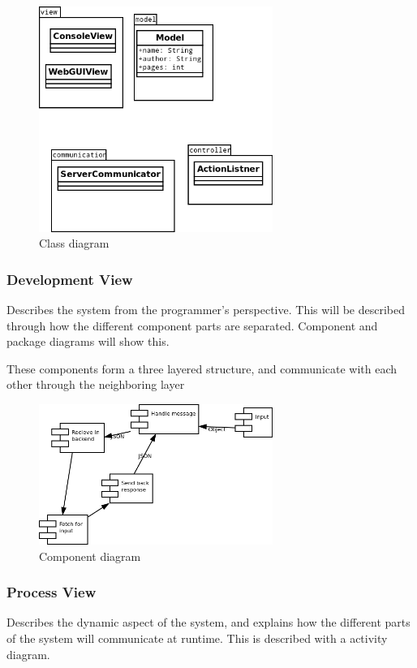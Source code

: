 \begin{figure}
\centering
\includegraphics[width=3in]{image/classdiagram.png}
\caption{Class diagram}
\end{figure}

\subsubsection{Development View}
Describes the system from the programmer's perspective. This will be described through how the different component parts are separated. Component and package diagrams will show this.

These components form a three layered structure, and communicate with each other through the neighboring layer

\begin{figure}
\centering
\includegraphics[width=3in]{image/componentdiagram.png}
\caption{Component diagram}
\end{figure}

\subsubsection{Process View}
Describes the dynamic aspect of the system, and explains how the different parts of the system will communicate at runtime. This is described with a activity diagram.


